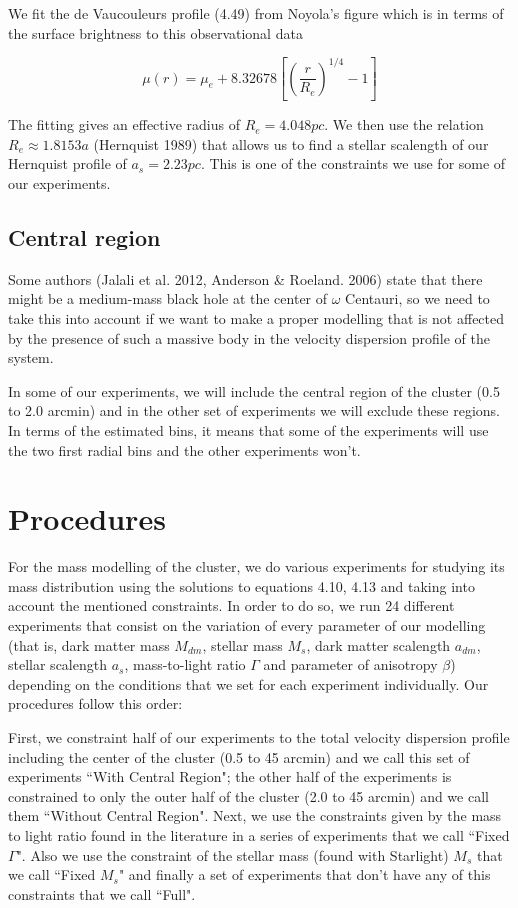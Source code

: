 We fit the de Vaucouleurs profile (4.49) from Noyola's figure which is in terms of the surface brightness to this observational data 

\begin{equation}
\mu(r)=\mu_{e}+8.32678\left[\left(\frac{r}{R_{e}}\right)^{1/4}-1\right]
\end{equation}

The fitting gives an effective radius of $R_{e}=4.048pc$. We then use the relation $R_{e}\approx1.8153a$ (Hernquist 1989) that allows us to find a stellar scalength of our Hernquist profile of $a_{s}=2.23pc$. This is one of the constraints we use for some of our experiments.

\subsection{Central region}

Some authors (Jalali et al. 2012, Anderson \& Roeland. 2006) state that there might be a medium-mass black hole at the center of $\omega$ Centauri, so we need to take this into account if we want to make a proper modelling that is not affected by the presence of such a massive body in the velocity dispersion profile of the system.

In some of our experiments, we will include the central region of the cluster (0.5 to 2.0 arcmin) and in the other set of experiments we will exclude these regions. In terms of the estimated bins, it means that some of the experiments will use the two first radial bins and the other experiments won't. 

\section{Procedures}

For the mass modelling of the cluster, we do various experiments for studying its mass distribution using the solutions to equations 4.10, 4.13 and taking into account the mentioned constraints. In order to do so, we run 24 different experiments that consist on the variation of every parameter of our modelling (that is, dark matter mass $M_{dm}$, stellar mass $M_{s}$, dark matter scalength $a_{dm}$, stellar scalength $a_{s}$, mass-to-light ratio $\Gamma$ and parameter of anisotropy $\beta$) depending on the conditions that we set for each experiment individually. Our procedures follow this order:

First, we constraint half of our experiments to the total velocity dispersion profile including the center of the cluster (0.5 to 45 arcmin) and we call this set of experiments ``With Central Region"; the other half of the experiments is constrained to only the outer half of the cluster (2.0 to 45 arcmin) and we call them ``Without Central Region". Next, we use the constraints given by the mass to light ratio found in the literature in a series of experiments that we call ``Fixed $\Gamma$". Also we use the constraint of the stellar mass (found with Starlight) $M_s$ that we call ``Fixed $M_s$" and finally a set of experiments that don't have any of this constraints that we call ``Full".

